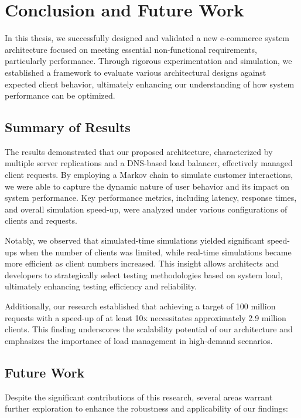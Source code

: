 \chapter{Conclusion and Future Work}

In this thesis, we successfully designed and validated a new e-commerce system architecture focused on meeting essential non-functional requirements, particularly performance. Through rigorous experimentation and simulation, we established a framework to evaluate various architectural designs against expected client behavior, ultimately enhancing our understanding of how system performance can be optimized.

\section{Summary of Results}

The results demonstrated that our proposed architecture, characterized by multiple server replications and a DNS-based load balancer, effectively managed client requests. By employing a Markov chain to simulate customer interactions, we were able to capture the dynamic nature of user behavior and its impact on system performance. Key performance metrics, including latency, response times, and overall simulation speed-up, were analyzed under various configurations of clients and requests. 

Notably, we observed that simulated-time simulations yielded significant speed-ups when the number of clients was limited, while real-time simulations became more efficient as client numbers increased. This insight allows architects and developers to strategically select testing methodologies based on system load, ultimately enhancing testing efficiency and reliability.

Additionally, our research established that achieving a target of 100 million requests with a speed-up of at least 10x necessitates approximately 2.9 million clients. This finding underscores the scalability potential of our architecture and emphasizes the importance of load management in high-demand scenarios.

\section{Future Work}

Despite the significant contributions of this research, several areas warrant further exploration to enhance the robustness and applicability of our findings:

